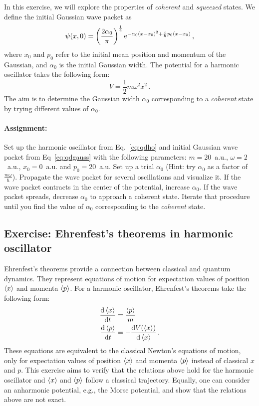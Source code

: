 In this exercise, we will explore the properties of \textit{coherent} and \textit{squeezed} states. We define the initial Gaussian wave packet as
\begin{equation}
    \psi(x,0) = \left(\frac{2\alpha_0}{\pi}\right)^{\frac{1}{4}} \mathrm{e}^{-\alpha_0(x-x_0)^2 +\frac{i}{\hbar}p_0(x-x_0)} \, ,
    \label{eq:qdgauss}
\end{equation}
where $x_0$ and $p_0$ refer to the initial mean position and momentum of the Gaussian, and $\alpha_0$ is the initial Gaussian width. The potential for a harmonic oscillator takes the following form:
\begin{equation}
    V = \frac{1}{2}m\omega^2x^2 \, .
    \label{eq:qdho}
\end{equation}
The aim is to determine the Gaussian width $\alpha_0$ corresponding to a \textit{coherent} state by trying different values of $\alpha_0$.

\paragraph{Assignment:} Set up the harmonic oscillator from Eq.~\eqref{eq:qdho} and initial Gaussian wave packet from Eq~\eqref{eq:qdgauss} with the following parameters: $m=20$~a.u., $\omega=2$~a.u., $x_0=0$~a.u. and $p_0=20$~a.u. Set up a trial $\alpha_0$ (Hint: try $\alpha_0$ as a factor of $\frac{m\omega}{\hbar}$). Propagate the wave packet for several oscillations and visualize it. If the wave packet contracts in the center of the potential, increase $\alpha_0$. If the wave packet spreads, decrease $\alpha_0$ to approach a coherent state. Iterate that procedure until you find the value of $\alpha_0$ corresponding to the \textit{coherent} state. 

\subsection*{Exercise: Ehrenfest's theorems in harmonic oscillator}

Ehrenfest's theorems provide a connection between classical and quantum dynamics. They represent equations of motion for expectation values of position $\braket{x}$ and momenta $\braket{p}$. For a harmonic oscillator, Ehrenfest's theorems take the following form:
\begin{align*}
    \frac{\mathop{}\!\mathrm{d} \braket{x}}{\mathop{}\!\mathrm{d} t} &= \frac{\braket{p}}{m} \\
    \frac{\mathop{}\!\mathrm{d} \braket{p}}{\mathop{}\!\mathrm{d} t} &= -\frac{\mathop{}\!\mathrm{d} V(\braket{x})}{\mathop{}\!\mathrm{d} \braket{x}} \, .
\end{align*}
These equations are equivalent to the classical Newton's equations of motion, only for expectation values of position $\braket{x}$ and momenta $\braket{p}$ instead of classical $x$ and $p$. This exercise aims to verify that the relations above hold for the harmonic oscillator and $\braket{x}$ and $\braket{p}$ follow a classical trajectory. Equally, one can consider an anharmonic potential, e.g., the Morse potential, and show that the relations above are not exact.

